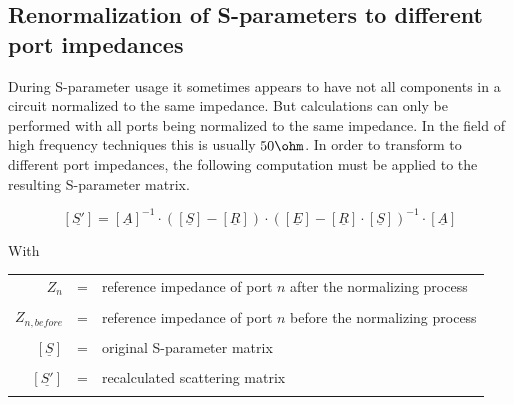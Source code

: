 \subsection{Renormalization of S-parameters to different port impedances}

During S-parameter usage it sometimes appears to have not all components
in a circuit normalized to the same impedance. But calculations can only
be performed with all ports being normalized to the same impedance. In
the field of high frequency techniques this is usually $50\ohm$. In order
to transform to different port impedances, the following computation must
be applied to the resulting S-parameter matrix.

\begin{equation}
\left[\underline{S'}\right] = \left[\underline{A}\right]^{-1} \cdot
\left(\left[\underline{S}\right] - \left[\underline{R}\right]\right) \cdot
\left(\left[\underline{E}\right] - \left[\underline{R}\right] \cdot \left[\underline{S}\right]\right)^{-1}
\cdot \left[\underline{A}\right]
\end{equation}

With

\addvspace{12pt}

\begin{tabular}{rll}
$Z_{n}$ & = & reference impedance of port $n$ after the normalizing process\\& &\\
$Z_{n,before}$ & = & reference impedance of port $n$ before the normalizing process\\& &\\
$\left[\underline{S}\right]$ & = & original S-parameter matrix\\& &\\
$\left[\underline{S'}\right]$ & = & recalculated scattering matrix\\& &\\
\end{tabular}

